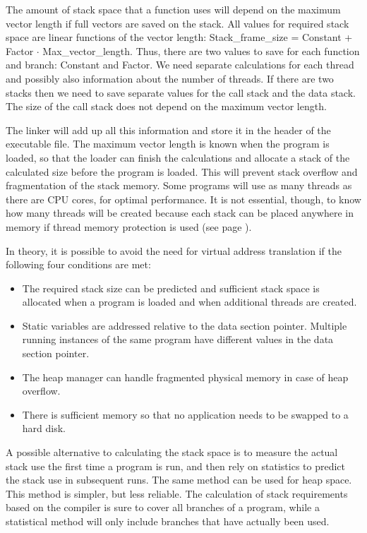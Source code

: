\documentclass[forwardcom.tex]{subfiles}
\begin{document}
The amount of stack space that a function uses will depend on the maximum vector length if full vectors are saved on the stack. All values for required stack space are linear functions of the vector length: Stack\_frame\_size = Constant + Factor $\cdot$ Max\_vector\_length. Thus, there are two values to save for each function and branch: Constant and Factor. We need separate calculations for each thread and possibly also information about the number of threads. If there are two stacks then we need to save separate values for the call stack and the data stack. The size of the call stack does not depend on the maximum vector length. 
\vspace{2mm}

The linker will add up all this information and store it in the header of the executable file. The maximum vector length is known when the program is loaded, so that the loader can finish the calculations and allocate a stack of the calculated size before the program is loaded. This will prevent stack overflow and fragmentation of the stack memory. Some programs will use as many threads as there are CPU cores, for optimal performance. It is not essential, though, to know how many threads will be created because each stack can be placed anywhere in memory if thread memory protection is used (see page \pageref{threadMemoryProtection}). 
\vspace{2mm}

In theory, it is possible to avoid the need for virtual address translation if the following four conditions are met: 

\begin{itemize}
\item The required stack size can be predicted and sufficient stack space is allocated when a 
program is loaded and when additional threads are created. 

\item Static variables are addressed relative to the data section pointer. Multiple running instances of the same program have different values in the data section pointer. 

\item The heap manager can handle fragmented physical memory in case of heap overflow. 

\item There is sufficient memory so that no application needs to be swapped to a hard disk.
\end{itemize}

A possible alternative to calculating the stack space is to measure the actual stack use the first time a program is run, and then rely on statistics to predict the stack use in subsequent runs. The same method can be used for heap space. This method is simpler, but less reliable. The calculation of stack requirements based on the compiler is sure to cover all branches of a program, while a statistical method will only include branches that have actually been used. 
\vspace{2mm}
\end{document}
